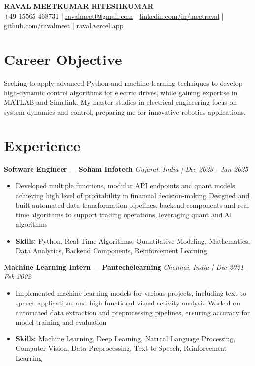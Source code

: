 \documentclass[a4paper,10pt]{article}
\begin{document}
\begin{center}
  {\Large\bfseries RAVAL MEETKUMAR RITESHKUMAR}\\[2pt]
  {\small +49 15565 468731 \;|\; \href{mailto:ravalmeett@gmail.com}{ravalmeett@gmail.com} \;|\; \href{https://www.linkedin.com/in/meetraval/}{linkedin.com/in/meetraval} \;|\; \href{https://github.com/ravalmeet}{github.com/ravalmeet} \;|\; \href{https://raval.vercel.app/}{raval.vercel.app}}
\end{center}
\vspace{-3pt}

\section*{Career Objective}
Seeking to apply advanced Python and machine learning techniques to develop high-dynamic control algorithms for electric drives, while gaining expertise in MATLAB and Simulink. My master studies in electrical engineering focus on system dynamics and control, preparing me for innovative robotics applications.\par

\section*{Experience}
\textbf{Software Engineer} — \textbf{Soham Infotech} \hfill \textit{Gujarat, India \;|\; Dec 2023 - Jan 2025}\par
\vspace{1pt}
\begin{itemize}
  \item Developed multiple functions, modular API endpoints and quant models achieving high level of profitability in financial decision-making Designed and built automated data transformation pipelines, backend components and real-time algorithms to support trading operations, leveraging quant and AI algorithms
  \item \textbf{Skills:} Python, Real-Time Algorithms, Quantitative Modeling, Mathematics, Data Analytics, Backend Components, Reinforcement Learning
\end{itemize}
\vspace{3pt}
\textbf{Machine Learning Intern} — \textbf{Pantechelearning} \hfill \textit{Chennai, India \;|\; Dec 2021 - Feb 2022}\par
\vspace{1pt}
\begin{itemize}
  \item Implemented machine learning models for various projects, including text-to-speech applications and high functional visual-activity analysis Worked on automated data extraction and preprocessing pipelines, ensuring accuracy for model training and evaluation
  \item \textbf{Skills:} Machine Learning, Deep Learning, Natural Language Processing, Computer Vision, Data Preprocessing, Text-to-Speech, Reinforcement Learning
\end{itemize}
\end{document}
